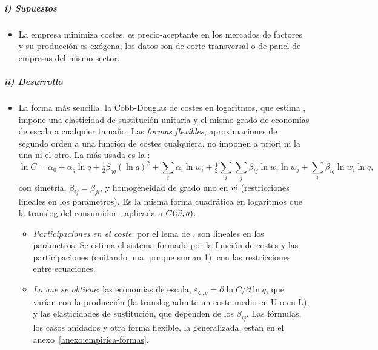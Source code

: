 \documentclass[11pt]{article}
\begin{document}
\subparagraph{i) Supuestos}

\begin{itemize}
\item La empresa minimiza costes, es precio-aceptante en los mercados de factores y su producción es exógena; los datos son de corte transversal o de panel de empresas del mismo sector.
\end{itemize}

\subparagraph{ii) Desarrollo}

\begin{itemize}
\item La forma más sencilla, la Cobb-Douglas de costes en logaritmos, que estima \textcite{Nerlove1963Returns}, impone una elasticidad de sustitución unitaria y el mismo grado de economías de escala a cualquier tamaño. Las \emph{formas flexibles}, aproximaciones de segundo orden a una función de costes cualquiera, no imponen a priori ni la una ni el otro. La más usada es la \nocite{ChristensenJorgensonLau1973Transcendental,ChristensenGreene1976Economies}:
  \begin{equation}
  \ln C=\alpha_0+\alpha_q\ln q+\tfrac12\beta_{qq}(\ln q)^2+\sum_i\alpha_i\ln w_i+\tfrac12\sum_i\sum_j\beta_{ij}\ln w_i\ln w_j+\sum_i\beta_{iq}\ln w_i\ln q, \label{eq:translog-costes}
  \end{equation}
  con simetría, $\beta_{ij}=\beta_{ji}$, y homogeneidad de grado uno en $\vec{w}$ (restricciones lineales en los parámetros). Es la misma forma cuadrática en logaritmos que la translog del consumidor , aplicada a $C(\vec{w},q)$.
  \begin{itemize}
  \item \emph{Participaciones en el coste}: por el lema de , son lineales en los parámetros:
    Se estima el sistema formado por la función de costes y las participaciones (quitando una, porque suman 1), con las restricciones entre ecuaciones.
  \item \emph{Lo que se obtiene}: las economías de escala, $\varepsilon_{C,q}=\partial\ln C/\partial\ln q$, que varían con la producción (la translog admite un coste medio en U o en L), y las elasticidades de sustitución, que dependen de los $\beta_{ij}$. Las fórmulas, los casos anidados y otra forma flexible, la  generalizada, están en el anexo~\ref{anexo:empirica-formas}.
  \end{itemize}
\end{itemize}
\end{document}
